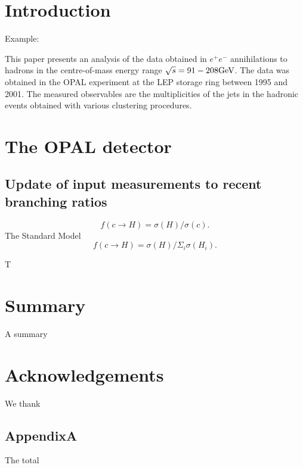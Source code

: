 \newpage
\section{Introduction}
\label{sec:int}

Example:\cite{Besson:2007aa}



This paper presents an analysis of the data obtained in $e^+e^-$ 
annihilations to hadrons in the centre-of-mass energy range 
$\sqrt{s}=91-208{\text{Ge}\kern-0.06667em\text{V\/}}$. The data was obtained in the OPAL experiment 
at the LEP storage ring between 1995 and  2001. 
The measured observables are the multiplicities of the jets in the 
hadronic events obtained with various clustering procedures.





\section{The OPAL detector}
\label{sec:detector}



\subsection{Update of input measurements to recent branching ratios}
\label{sec:pdgupdate}

\begin{equation}\label{eq:ffwithcharmcs}
f(c \rightarrow H) = {\sigma(H)}/{\sigma(c)}. 
\end{equation}
The Standard Model 
\begin{equation}\label{eq:ffwithsumh}
f(c\rightarrow H)={\sigma(H)}/{\Sigma_{i}\sigma(H_{i})}. 
\end{equation}

T
\section{Summary}                      
\label{sec:summary}
A summary 
%
\section*{Acknowledgements}
\label{sec:acknowledgements}
We thank 
\FloatBarrier
\begin{appendices}
\section{AppendixA}
\label{sec:appendixA}
The  total  
\end{appendices}
